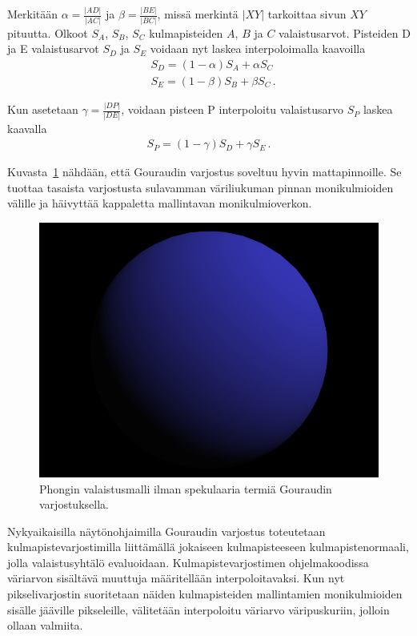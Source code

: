 \documentclass[finnish]{tktltiki2}
\theoremstyle{definition}
\theoremstyle{remark}
\begin{document}
Merkitään $\alpha = \frac{\left|AD\right|}{\left|AC\right|}$ ja $\beta = \frac{\left|BE\right|}{\left|BC\right|}$, missä merkintä $\left|XY\right|$ tarkoittaa sivun $XY$ pituutta. Olkoot $S_A$, $S_B$, $S_C$ kulmapisteiden $A$, $B$ ja $C$ valaistusarvot. Pisteiden D ja E valaistusarvot $S_D$ ja $S_E$ voidaan nyt laskea interpoloimalla kaavoilla
\begin{align*}
& S_D = (1 - \alpha)S_A + \alpha S_C\\
& S_E = (1 - \beta)S_B + \beta S_C\,.
\end{align*}

Kun asetetaan $\gamma = \frac{\left|DP\right|}{\left|DE\right|}$, voidaan pisteen P interpoloitu valaistusarvo $S_P$ laskea kaavalla
\begin{align*}
S_P = (1 - \gamma)S_D + \gamma S_E\,.
\end{align*}

Kuvasta~\ref{fig:Gouraudin_varjostus} nähdään, että Gouraudin varjostus soveltuu hyvin mattapinnoille. Se tuottaa tasaista varjostusta sulavamman väriliukuman pinnan monikulmioiden välille ja häivyttää kappaletta mallintavan monikulmioverkon.

\begin{figure}[h]
\centering
\includegraphics[scale=0.6]{img/gouraud_ambient_diff_crop.png}
\caption{Phongin valaistusmalli ilman spekulaaria termiä Gouraudin varjostuksella.}
\label{fig:Gouraudin_varjostus}
\end{figure}

Nykyaikaisilla näytönohjaimilla Gouraudin varjostus toteutetaan kulmapistevarjostimilla liittämällä jokaiseen kulmapisteeseen kulmapistenormaali, jolla valaistusyhtälö evaluoidaan. Kulmapistevarjostimen ohjelmakoodissa väriarvon sisältävä muuttuja määritellään interpoloitavaksi. Kun nyt pikselivarjostin suoritetaan näiden kulmapisteiden mallintamien monikulmioiden sisälle jääville pikseleille, välitetään interpoloitu väriarvo väripuskuriin, jolloin ollaan valmiita.
\end{document}
